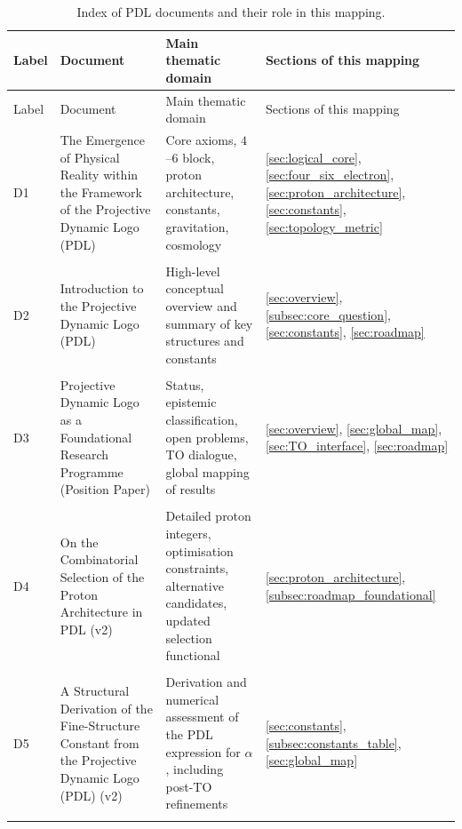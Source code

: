 \documentclass[11pt,a4paper]{article}
\begin{document}
\begin{longtable}{@{}p{0.9cm}L{5cm}L{6.5cm}L{2.4cm}@{}}
  \caption{Index of PDL documents and their role in this mapping.}
  \label{tab:doc_index}\\

  \toprule
  Label & Document & Main thematic domain & Sections of this mapping \\
  \midrule
  \endfirsthead

  \toprule
  Label & Document & Main thematic domain & Sections of this mapping \\
  \midrule
  \endhead

  \bottomrule
  \endfoot

  D1 &
  The Emergence of Physical Reality within the Framework of the Projective Dynamic Logo (PDL) &
  Core axioms, $4$--$6$ block, proton architecture, constants, gravitation, cosmology &
  \ref{sec:logical_core}, \ref{sec:four_six_electron}, \ref{sec:proton_architecture}, \ref{sec:constants}, \ref{sec:topology_metric} \\\\[0.4em]

  D2 &
  Introduction to the Projective Dynamic Logo (PDL) &
  High-level conceptual overview and summary of key structures and constants &
  \ref{sec:overview}, \ref{subsec:core_question}, \ref{sec:constants}, \ref{sec:roadmap} \\\\[0.4em]

  D3 &
  Projective Dynamic Logo as a Foundational Research Programme (Position Paper) &
  Status, epistemic classification, open problems, TO dialogue, global mapping of results &
  \ref{sec:overview}, \ref{sec:global_map}, \ref{sec:TO_interface}, \ref{sec:roadmap} \\\\[0.4em]

  D4 &
  On the Combinatorial Selection of the Proton Architecture in PDL (v2) &
  Detailed proton integers, optimisation constraints, alternative candidates, updated selection functional &
  \ref{sec:proton_architecture}, \ref{subsec:roadmap_foundational} \\\\[0.4em]

  D5 &
  A Structural Derivation of the Fine-Structure Constant from the Projective Dynamic Logo (PDL) (v2) &
  Derivation and numerical assessment of the PDL expression for $\alpha$, including post-TO refinements &
  \ref{sec:constants}, \ref{subsec:constants_table}, \ref{sec:global_map} \\\\[0.4em]


\end{longtable}
\end{document}

